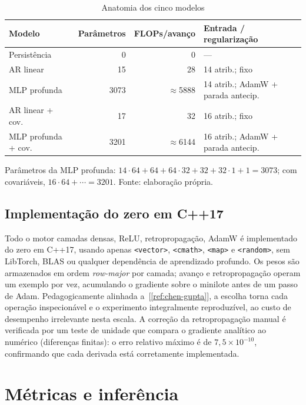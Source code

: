 \documentclass[12pt,a4paper,oneside]{article}
\newcommand{\C}[1]{[\ref{#1}]}
\begin{document}
\begin{table}[H]
\centering
\caption{Anatomia dos cinco modelos}
\label{tab:modelos}
\small
\begin{tabular}{@{}lrrl@{}}
\toprule
\textbf{Modelo} & \textbf{Parâmetros} & \textbf{FLOPs/avanço} & \textbf{Entrada / regularização} \\
\midrule
Persistência       & 0          & 0            & --- \\
AR linear          & 15         & 28           & 14 atrib.; fixo \\
MLP profunda       & \num{3073} & $\approx$\num{5888} & 14 atrib.; AdamW + parada antecip. \\
AR linear + cov.   & 17         & 32           & 16 atrib.; fixo \\
MLP profunda + cov.& \num{3201} & $\approx$\num{6144} & 16 atrib.; AdamW + parada antecip. \\
\bottomrule
\end{tabular}
\par\smallskip
{\footnotesize Parâmetros da MLP profunda: $14{\cdot}64{+}64+64{\cdot}32{+}32+32{\cdot}1{+}1=\num{3073}$;
com covariáveis, $16{\cdot}64{+}\cdots=\num{3201}$. Fonte: elaboração própria.}
\end{table}

\subsection{Implementação do zero em C++17}

Todo o motor \textemdash{} camadas densas, ReLU, retropropagação, AdamW
\textemdash{} é implementado do zero em C++17, usando apenas
\texttt{<vector>}, \texttt{<cmath>}, \texttt{<map>} e \texttt{<random>}, sem
LibTorch, BLAS ou qualquer dependência de aprendizado profundo. Os pesos são armazenados em
ordem \emph{row-major} por camada; avanço e retropropagação operam um
exemplo por vez, acumulando o gradiente sobre o minilote antes de um passo
de Adam. Pedagogicamente alinhada a~\C{ref:chen-gupta}, a escolha torna
cada operação inspecionável e o experimento integralmente reproduzível, ao
custo de desempenho irrelevante nesta escala. A correção da retropropagação
manual é verificada por um teste de unidade que compara o gradiente
analítico ao numérico (diferenças finitas): o erro relativo máximo é de
$7{,}5\times 10^{-10}$, confirmando que cada derivada está corretamente
implementada.

\section{Métricas e inferência}
\label{sec:metricas}
\end{document}
